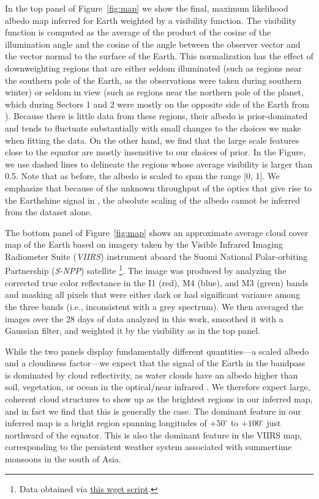 \documentclass[modern]{aastex62}
\begin{document}
In the top panel of Figure~\ref{fig:map} we show the final,
maximum likelihood albedo map inferred for Earth weighted by a visibility function.
The visibility function is computed as the average of the product of the 
cosine of the illumination angle and the cosine of the angle between the 
observer vector and the vector normal to the surface of the Earth. This normalization
has the effect of downweighting regions that are either seldom illuminated (such
as regions near the southern pole of the Earth, as the observations were taken during
southern winter) or seldom in view (such as regions near the northern pole of the planet,
which during Sectors 1 and 2 were mostly on the opposite side of the Earth from \TESS).
Because there is little data from these regions, their albedo is prior-dominated
and tends to fluctuate substantially with small changes to the choices we make
when fitting the data. On the other hand, we find that the large scale features close to
the equator are mostly insensitive to our choices of prior. In the Figure,
we use dashed lines to delineate the regions whose average visibility is larger
than 0.5. Note that as before, the albedo is scaled to span the range [0, 1]. We emphasize
that because of the unknown throughput of the optics that give rise to the Earthshine
signal in \TESS, the absolute scaling of the albedo cannot be inferred from the
dataset alone.

The bottom panel of Figure~\ref{fig:map} shows an approximate average
cloud cover map of the Earth based on imagery taken by the
Visible Infrared Imaging Radiometer Suite (\emph{VIIRS}) instrument aboard the 
Suomi National Polar-orbiting Partnership (\emph{S-NPP}) satellite%
\footnote{Data obtained via 
\href{https://github.com/rodluger/earthshine/blob/master/tex/figures/viirs.sh}{this wget script}.}. 
The image was produced by analyzing the corrected true color reflectance in the
I1 (red), M4 (blue), and M3 (green) bands and masking
all pixels that were either dark or had significant variance among the three
bands (i.e., inconsistent with a grey spectrum). We then averaged the images
over the 28 days of data analyzed in this work, smoothed it 
with a Gaussian filter, and weighted it by the \TESS visibility as in the top panel.

While the two panels display fundamentally different quantities---a scaled albedo
and a cloudiness factor---we expect that the signal of the Earth in the \TESS
bandpass is dominated by cloud reflectivity, as water clouds have an albedo
higher than soil, vegetation, or ocean in the optical/near infrared
\citep[e.g.,][]{Jedlovec2009}. We therefore
expect large, coherent cloud structures to show up as the brightest regions 
in our inferred map, and in fact we find that this is generally the case. The
dominant feature in our inferred map is a bright region spanning longitudes
of $+50^\circ$ to $+100^\circ$ just northward of the equator. This is also the
dominant feature in the VIIRS map, corresponding to the persistent weather system
associated with summertime monsoons in the south of Asia.
\end{document}
